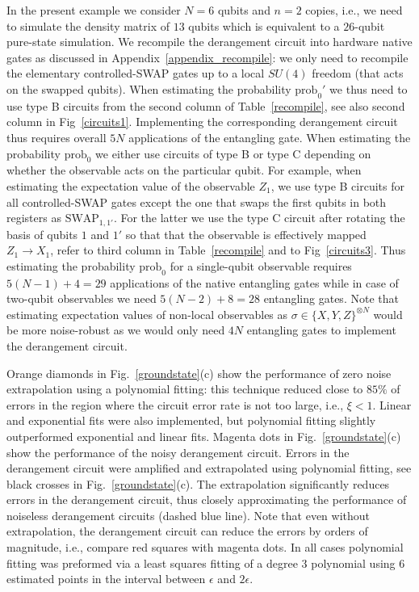\documentclass[aps,prx,showpacs,twocolumn,reprint]{revtex4-2}
\newcommand{\prob}{\mathrm{prob}_0}
\begin{document}
{In the present example we consider $N=6$ qubits and $n=2$ copies, i.e., we need to simulate the density matrix
of $13$ qubits which is equivalent to a $26$-qubit pure-state simulation.
We recompile the derangement circuit into hardware native gates as discussed in Appendix~\ref{appendix_recompile}:
we only need to recompile the elementary controlled-SWAP gates up to a local $SU(4)$ freedom (that acts on the swapped qubits).
When estimating the probability $\prob'$ we thus need to use type B circuits from the second column of Table~\ref{recompile},
see also second column in Fig~\ref{circuits1}. Implementing the corresponding derangement circuit thus requires overall $5N$ applications of the
entangling gate. When estimating the probability $\prob$ we either use circuits of type B or type C depending on whether the
observable acts on the particular qubit. For example, when estimating the expectation value of the observable $Z_1$,
we use type B circuits for all controlled-SWAP gates except the one that swaps the first qubits in both registers as
$\text{SWAP}_{1,1'}$. For the latter we use the type C circuit after rotating the basis of qubits $1$ and $1'$ so that
that the observable is effectively mapped $Z_1 \rightarrow X_1$, refer to third column in Table~\ref{recompile}
and to Fig~\ref{circuits3}. Thus estimating the probability $\prob$ for a single-qubit observable requires $5(N-1)+4 = 29$
applications of the native entangling gates while in case of two-qubit observables we need $5(N-2)+8 = 28$ entangling gates.
Note that estimating expectation values of non-local observables as $\sigma \in \{X,Y,Z\}^{\otimes N}$ would be more
noise-robust as we would only need $4N$ entangling gates to implement the derangement circuit.




Orange diamonds in Fig.~\ref{groundstate}(c) show the performance of zero noise extrapolation using a polynomial fitting:
this technique reduced close to
$85\%$ of errors in the region where the circuit error rate is not too large, i.e., $\xi < 1$. Linear and exponential fits were
also implemented, but polynomial fitting slightly outperformed exponential and linear fits.
Magenta dots in Fig.~\ref{groundstate}(c) show the performance of the noisy derangement circuit. Errors in the derangement circuit
were amplified and extrapolated using polynomial fitting, see black crosses in Fig.~\ref{groundstate}(c).
The extrapolation significantly reduces errors in the derangement circuit, thus closely approximating the performance of
noiseless derangement circuits (dashed blue line).
Note that even without extrapolation, the derangement circuit can reduce the errors by orders of magnitude, i.e., 
compare red squares with magenta dots. In all cases polynomial fitting was preformed via a least squares fitting
of a degree $3$ polynomial using $6$ estimated points in the interval between $\epsilon$ and $2\epsilon$.





}
\end{document}
